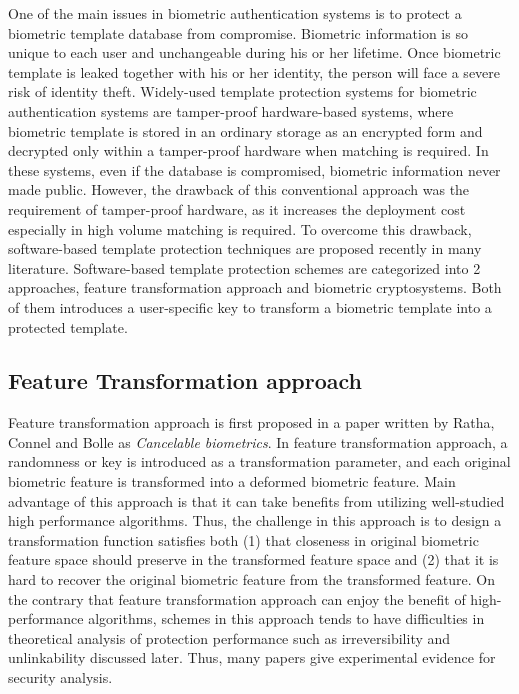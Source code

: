 One of the main issues in biometric authentication systems is to protect a biometric template database from compromise. Biometric information is so unique to each user and unchangeable during his or her lifetime. Once biometric template is leaked together with his or her identity, the person will face a severe risk of identity theft. Widely-used template protection systems for biometric authentication systems are tamper-proof hardware-based systems, where biometric template is stored in an ordinary storage as an encrypted form and decrypted only within a tamper-proof hardware  when matching is required. In these systems, even if the database is compromised, biometric information never made public. However,  the drawback of this conventional approach was the requirement of tamper-proof hardware, as it increases the deployment cost especially in high volume matching is required. To overcome this drawback, software-based template protection techniques are proposed recently in many literature\cite{}. Software-based template protection schemes are categorized into 2 approaches\cite{Nagar:2010tg}, feature transformation approach and biometric cryptosystems. Both of them introduces a user-specific key to transform a biometric template into a protected template. 

\subsection{Feature Transformation approach}
Feature transformation approach is first proposed in a paper written by Ratha, Connel and Bolle\cite{Ratha:2001gu} as {\it Cancelable biometrics}. In feature transformation approach, a randomness or key is introduced as a transformation parameter, and each original biometric feature is transformed into a deformed biometric feature. Main advantage of this approach is that it can take benefits from utilizing well-studied high performance algorithms. Thus, the challenge in this approach is to design a transformation function satisfies both (1) that closeness in original biometric feature space should preserve in the transformed feature space and (2) that it is hard to recover the original biometric feature from the transformed feature. On the contrary that feature transformation approach can enjoy the benefit of high-performance algorithms, schemes in this approach tends to have difficulties in theoretical analysis of protection performance such as irreversibility and unlinkability discussed later. Thus, many papers give experimental evidence for security analysis. 


